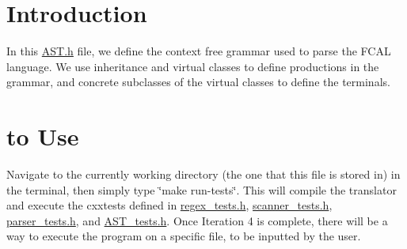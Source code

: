 \hypertarget{index_Introduction}{}\section{Introduction}\label{index_Introduction}
In this \hyperlink{AST_8h_source}{A\-S\-T.\-h} file, we define the context free grammar used to parse the F\-C\-A\-L language. We use inheritance and virtual classes to define productions in the grammar, and concrete subclasses of the virtual classes to define the terminals.\hypertarget{index_How}{}\section{to Use}\label{index_How}
Navigate to the currently working directory (the one that this file is stored in) in the terminal, then simply type \char`\"{}make run-\/tests\char`\"{}. This will compile the translator and execute the cxxtests defined in \hyperlink{regex__tests_8h_source}{regex\-\_\-tests.\-h}, \hyperlink{scanner__tests_8h_source}{scanner\-\_\-tests.\-h}, \hyperlink{parser__tests_8h_source}{parser\-\_\-tests.\-h}, and \hyperlink{AST__tests_8h_source}{A\-S\-T\-\_\-tests.\-h}. Once Iteration 4 is complete, there will be a way to execute the program on a specific file, to be inputted by the user. 